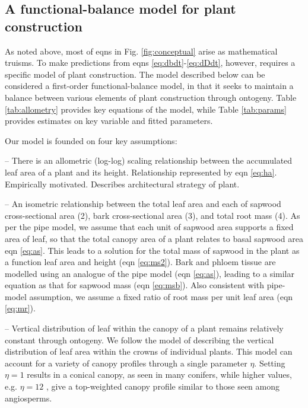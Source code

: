 \documentclass[a4paper,11pt]{article}
\begin{document}
\subsection{A functional-balance model for plant construction}

As noted above, most of eqns in Fig. \ref{fig:conceptual} arise as mathematical truisms. To make predictions from eqns \ref{eq:dbdt}-\ref{eq:dDdt}, however, requires a specific model of plant construction. The model described below can be considered a first-order functional-balance model, in that it seeks to maintain a balance between various elements of plant construction through ontogeny. Table \ref{tab:allometry} provides key equations of the model, while Table \ref{tab:params} provides estimates on key variable and fitted parameters.

Our model is founded on four key assumptions:

 -- There is an allometric (log-log) scaling relationship between the accumulated leaf area of a plant and its height. Relationship represented by eqn \ref{eq:ha}. Empirically motivated. Describes architectural strategy of plant.

 -- An isometric relationship between the total leaf area and each of sapwood cross-sectional area (2), bark cross-sectional area (3), and total root mass (4). As per the pipe model, \citep{Shinozaki-1964} we assume that each unit of sapwood area supports a fixed area of leaf, so that the total canopy area of a plant relates to basal sapwood area eqn \ref{eq:as}. This leads to a solution for the total mass of sapwood in the plant as a function leaf area and height (eqn \ref{eq:ms2}). Bark and phloem tissue are modelled using an analogue of the pipe model (eqn \ref{eq:as}), leading to a similar equation as that for sapwood mass (eqn \ref{eq:msb}). Also consistent with pipe-model assumption, we assume a fixed ratio of root mass per unit leaf area (eqn \ref{eq:mr}).

 -- Vertical distribution of leaf within the canopy of a plant remains relatively constant through ontogeny. We follow the model of \citep{Yokozawa-1995} describing the vertical distribution of leaf area within the crowns of individual plants. This model can account for a variety of canopy profiles through a single parameter $\eta$. Setting $\eta=1$ results in a conical canopy, as seen in many conifers, while higher values, e.g. $\eta=12$ , give a top-weighted canopy profile similar to those seen among angiosperms.
\end{document}
